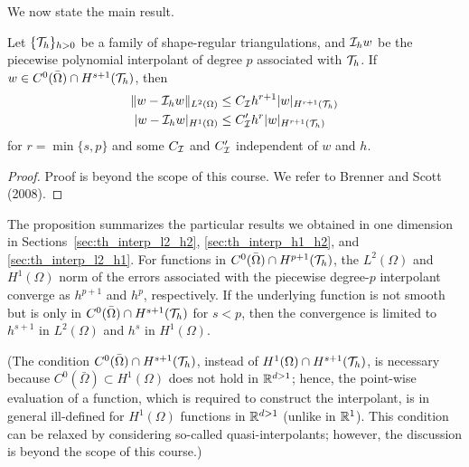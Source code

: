 We now state the main result.
\begin{proposition}
  \label{prop:th_interp_gen}
  Let $\{\mathcal{T}_h\}_{h > 0}$ be a family of shape-regular triangulations, and $\mathcal{I}_h w$ be the piecewise polynomial interpolant of degree $p$ associated with $\mathcal{T}_h$. If $w \in C^0(\bar \Omega) \cap H^{s+1}(\mathcal{T}_h)$, then %
\begin{align*}
  \| w - \mathcal{I}_h w \|_{L^2(\Omega)} &\leq C_{\mathcal{I}} h^{r+1} | w |_{H^{r+1}(\mathcal{T}_h)} \\
  | w - \mathcal{I}_h w |_{H^1(\Omega)} &\leq C'_{\mathcal{I}} h^{r} | w |_{H^{r+1}(\mathcal{T}_h)}
\end{align*}
for $r = \min\{ s,p \}$ and some $C_{\mathcal{I}}$ and $C'_{\mathcal{I}}$ independent of $w$ and $h$.
\begin{proof}
  Proof is beyond the scope of this course. We refer to Brenner and Scott (2008).
\end{proof}
\end{proposition}
The proposition summarizes the particular results we obtained in one dimension in Sections~\ref{sec:th_interp_l2_h2}, \ref{sec:th_interp_h1_h2}, and \ref{sec:th_interp_l2_h1}.  For functions in $C^0(\bar \Omega) \cap H^{p+1}(\mathcal{T}_h)$, the $L^2(\Omega)$ and $H^1(\Omega)$ norm of the errors associated with the piecewise degree-$p$ interpolant converge as $h^{p+1}$ and $h^p$, respectively.  If the underlying function is not smooth but is only in $C^0(\bar \Omega) \cap H^{s+1}(\mathcal{T}_h)$ for $s < p$, then the convergence is limited to $h^{s+1}$ in $L^2(\Omega)$ and $h^s$ in $H^1(\Omega)$.

(The condition $C^0(\bar \Omega) \cap H^{s+1}(\mathcal{T}_h)$, instead of $H^1(\Omega) \cap H^{s+1}(\mathcal{T}_h)$, is necessary because $C^0(\bar \Omega) \subset H^1(\Omega)$ does not hold in $\mathbb{R}^{d > 1}$; hence, the point-wise evaluation of a function, which is required to construct the interpolant, is in general ill-defined for $H^1(\Omega)$ functions in $\mathbb{R}^{d > 1}$ (unlike in $\mathbb{R}^1$). This condition can be relaxed by considering so-called quasi-interpolants; however, the discussion is beyond the scope of this course.)

